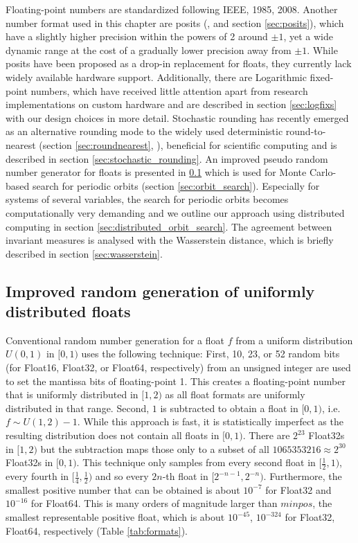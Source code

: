Floating-point numbers are standardized following IEEE, 1985, 2008. Another number format used in this chapter are posits
(\cite{Gustafson2017a}, and section \ref{sec:posits}), which have a slightly higher precision within the powers of 2
around $\pm1$, yet a wide dynamic range at the cost of a gradually lower precision away from $\pm1$. While posits
have been proposed as a drop-in replacement for floats, they currently lack widely available hardware support.
Additionally, there are Logarithmic fixed-point numbers, which have received little attention apart from research
implementations on custom hardware \citep{Johnson2020} and are described in section \ref{sec:logfixs} with our
design choices in more detail. Stochastic rounding has recently emerged as an alternative rounding mode to the
widely used deterministic round-to-nearest (section \ref{sec:roundnearest}, \cite{IEEE1985}), beneficial for scientific computing
\citep{Croci2020,Fasi2021,Hopkins2020,Paxton2021} and is described in section \ref{sec:stochastic_rounding}.
An improved pseudo random number generator for floats is presented in \ref{sec:randfloat} which is used for Monte
Carlo-based search for periodic orbits (section \ref{sec:orbit_search}). Especially for systems of several variables,
the search for periodic orbits becomes computationally very demanding and we outline our approach using
distributed computing in section \ref{sec:distributed_orbit_search}. The agreement between invariant measures
is analysed with the Wasserstein distance, which is briefly described in section \ref{sec:wasserstein}.

\subsection[Improved random number generation of floats]{Improved random generation of uniformly distributed floats}
\label{sec:randfloat}

Conventional random number generation for a float $f$ from a uniform distribution $U(0,1)$
in $[0,1)$ uses the following technique: First, 10, 23, or 52 random bits (for Float16, Float32, or Float64, respectively)
from an unsigned integer are used to set the mantissa bits of floating-point 1. This creates a floating-point
number that is uniformly distributed in $[1,2)$ as all float formats are uniformly distributed in that range. Second,
$1$ is subtracted to obtain a float in $[0,1)$, i.e. $f \sim U(1,2) - 1$. While this approach is fast, it is statistically
imperfect as the resulting distribution does not contain all floats in $[0,1)$. There are $2^{23}$ Float32s in $[1,2)$
but the subtraction maps those only to a subset of all $1065353216 \approx 2^{30}$ Float32s in $[0,1)$.
This technique only samples from every second float in $[\tfrac{1}{2},1)$, every fourth in
$[\tfrac{1}{4},\tfrac{1}{2})$ and so every $2n$-th float in $[2^{-n-1},2^{-n})$. Furthermore, the smallest positive
number that can be obtained is about $10^{-7}$ for Float32 and $10^{-16}$ for Float64. This is many orders of
magnitude larger than $minpos$, the smallest representable positive float, which is about $10^{-45}$, $10^{-324}$
for Float32, Float64, respectively (Table \ref{tab:formats}).


